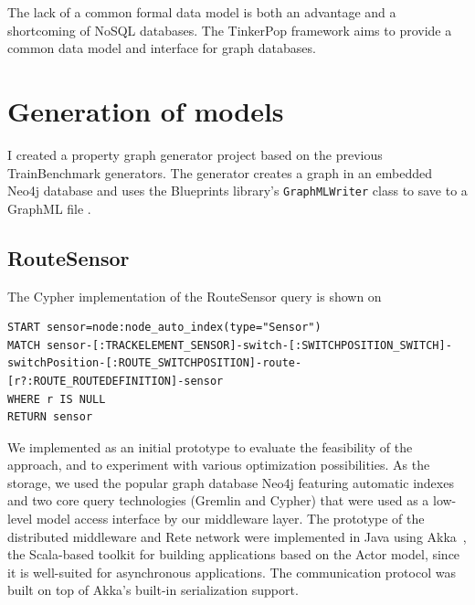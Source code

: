 The lack of a common formal data model is both an advantage and a shortcoming of NoSQL databases. The TinkerPop framework \cite{TinkerPop} aims to provide a common data model and interface for graph databases.

\section{Generation of models}

I created a property graph generator project based on the previous TrainBenchmark generators. The generator creates a graph in an embedded Neo4j database and uses the Blueprints library's \texttt{GraphMLWriter} class to save to a GraphML file \cite{Blueprints}.

\subsection{RouteSensor}

The Cypher implementation of the RouteSensor query is shown on %

\begin{lstlisting}[caption=Cyper query for the RouteSensor test case, label=lst:cypher-routesensor, breaklines=true]
START sensor=node:node_auto_index(type="Sensor")
MATCH sensor-[:TRACKELEMENT_SENSOR]-switch-[:SWITCHPOSITION_SWITCH]-switchPosition-[:ROUTE_SWITCHPOSITION]-route-[r?:ROUTE_ROUTEDEFINITION]-sensor
WHERE r IS NULL
RETURN sensor
\end{lstlisting}



We implemented \iqd{} as an initial prototype to evaluate the feasibility of the approach, and to experiment with various optimization possibilities. As the storage, we used the popular graph database Neo4j \cite{neo4j} featuring automatic indexes and two core query technologies (Gremlin and Cypher) that were used as a low-level model access interface by our middleware layer. %
The prototype of the distributed middleware and Rete network were implemented in Java using Akka~\cite{akka}, the Scala-based toolkit for building applications based on the Actor model, since it is well-suited for asynchronous applications. The communication protocol was built on top of Akka's built-in serialization support.


